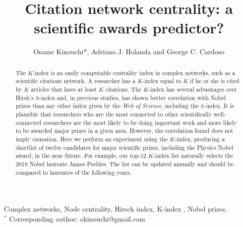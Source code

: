 \documentclass[final,3p,times]{elsarticle}
\begin{document}
\begin{frontmatter}


\title{Citation network centrality: a scientific awards predictor?}
\author{Osame Kinouchi*, Adriano J. Holanda and George C. Cardoso}

\address{Departamento de F\'{i}sica, FFCLRP, Universidade de S\~ao Paulo\\ Ribeir\~ao Preto - SP, 14040-901, Brazil}

\begin{abstract}
  The $K$-index is an easily computable centrality index in complex
  networks, such as a scientific citations network. A researcher has a
  $K$-index equal to $K$ if he or she is cited by $K$ articles that have
  at least $K$ citations.  The $K$-index has several advantages over
  Hirsh's $h$-index and, in previous studies, has shown better
  correlation with Nobel prizes than any other index given by the {\em
    Web of Science},  including the $h$-index.  It is plausible that researchers who are the most connected to other scientifically well-connected researchers are the  most likely to be doing important work and more likely to be awarded major prizes in a given area. However, the correlation found does not imply  causation.
  Here we perform an experiment using the $K$-index, producing a shortlist of twelve candidates for major scientific prizes, including the
 Physics Nobel award, in the near future. For example, our
  top-12 $K$-index list naturally selects the 2019 Nobel laureate James Peebles. The list
  can be updated annually and should be compared to 
  laureates  of the following years.
\end{abstract}

\begin{keyword}
Complex networks\sep
Node centrality\sep
Hirsch index\sep
K-index \sep
Nobel prizes.\\
$^*$ Corresponding author: okinouchi@gmail.com
\end{keyword}

\end{frontmatter}

\newpage
\end{document}
